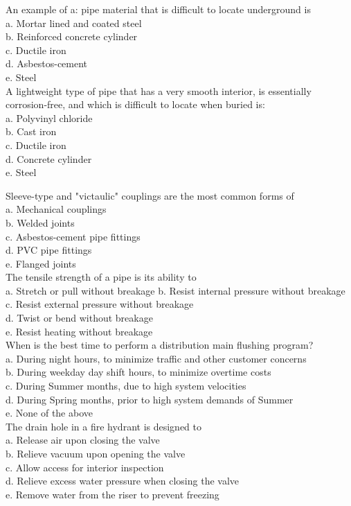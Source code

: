 An example of a: pipe material that is difficult to locate underground is\\
a. Mortar lined and coated steel\\
b. Reinforced concrete cylinder\\
c. Ductile iron\\
d. Asbestos-cement\\
e. Steel\\

A lightweight type of pipe that has a very smooth interior, is essentially corrosion-free, and which is difficult to locate when buried is:\\
a. Polyvinyl chloride\\
b. Cast iron\\
c. Ductile iron\\
d. Concrete cylinder\\
e. Steel

Sleeve-type and "victaulic" couplings are the most common forms of\\
a. Mechanical couplings\\
b. Welded joints\\
c. Asbestos-cement pipe fittings\\
d. PVC pipe fittings\\
e. Flanged joints\\

The tensile strength of a pipe is its ability to\\
a. Stretch or pull without breakage
b. Resist internal pressure without breakage\\
c. Resist external pressure without breakage\\
d. Twist or bend without breakage\\
e. Resist heating without breakage\\

When is the best time to perform a distribution main flushing program?\\
a. During night hours, to minimize traffic and other customer concerns\\
b. During weekday day shift hours, to minimize overtime costs\\
c. During Summer months, due to high system velocities\\
d. During Spring months, prior to high system demands of Summer\\
e. None of the above\\

The drain hole in a fire hydrant is designed to\\
a. Release air upon closing the valve\\
b. Relieve vacuum upon opening the valve\\
c. Allow access for interior inspection\\
d. Relieve excess water pressure when closing the valve\\
e. Remove water from the riser to prevent freezing\\

